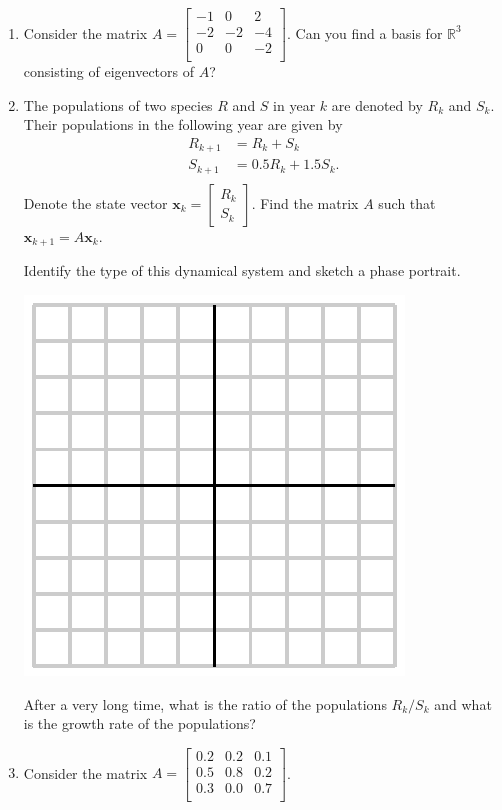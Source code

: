 \documentclass[12pt]{article}
\newcommand{\vs}[1]{\vspace{#1in}}
\newcommand{\xvec}{{\mathbf x}}
\newcommand{\real}{{\mathbb R}}
\newcommand{\twovec}[2]{\left[\begin{array}{r}#1 \\ #2
    \end{array}\right]}
\begin{document}
\begin{enumerate}
\item Consider the matrix
  $
  A =
  \left[
    \begin{array}{ccc}
      -1 & 0 & 2 \\
      -2 & -2 & -4 \\
      0 & 0 & -2 \\
    \end{array}
  \right]
  $.
  Can you find a basis for $\real^3$ consisting of eigenvectors of $A$?

  \newpage
\item The populations of two species $R$ and $S$ in year $k$ are
  denoted by $R_k$ and $S_k$.  Their populations in the following year
  are given by
  $$
  \begin{aligned}
    R_{k+1} & = R_k + S_k \\
    S_{k+1} & = 0.5R_k+1.5S_k. \\
  \end{aligned}
  $$
  Denote the state vector $\xvec_k=\twovec{R_k}{S_k}$.  Find the
  matrix $A$ such that $\xvec_{k+1}=A\xvec_k$.

  \vs{1}
  Identify the type of this dynamical system and sketch a phase
  portrait.

  \includegraphics{empty.eps}

  After a very long time, what is the ratio of the populations
  $R_k/S_k$ and what is the growth rate of the populations?

  \vs{1}
\item Consider the matrix
  $A = 
  \left[
    \begin{array}{ccc}
      0.2 & 0.2 & 0.1 \\
      0.5 & 0.8 & 0.2 \\
      0.3 & 0.0 & 0.7 \\
    \end{array}
  \right]
  $.


\end{enumerate}
\end{document}
